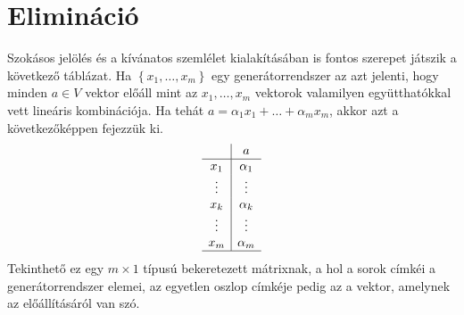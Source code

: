 \documentclass[a4paper, showtrims]{memoir}
\theoremstyle{plain}
\theoremstyle{remark}
\theoremstyle{definition}
\begin{document}
\section{Elimináció}
Szokásos jelölés és a kívánatos szemlélet kialakításában is fontos szerepet játszik a következő táblázat.
Ha $\left\{ x_1,\ldots,x_m \right\}$ egy generátorrendszer az azt jelenti, hogy minden $a\in V$ vektor
előáll mint az $x_1,\ldots,x_m$ vektorok valamilyen együtthatókkal vett lineáris kombinációja.
Ha tehát $a=\alpha_1x_1+\dots+\alpha_mx_m$, akkor azt a következőképpen fejezzük ki.
\[
	\begin{array}{c|c}
		       & a        \\
		\hline
		x_1    & \alpha_1 \\
		\vdots & \vdots   \\
		x_k    & \alpha_k \\
		\vdots & \vdots   \\
		x_m    & \alpha_m \\
		\hline
	\end{array}
\]
Tekinthető ez egy $m\times 1$ típusú bekeretezett mátrixnak, a hol a sorok címkéi a generátorrendszer elemei,
az egyetlen oszlop címkéje pedig az a vektor, amelynek az előállításáról van szó.
\end{document}

